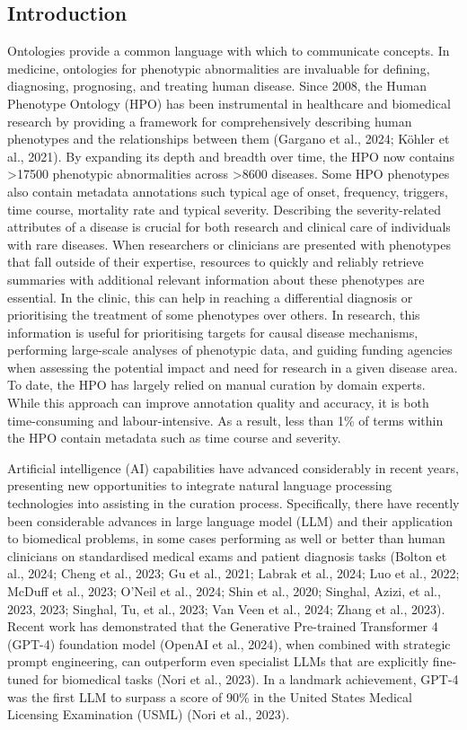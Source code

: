 \documentclass[
]{agujournal2019}
\begin{document}
\subsection{Introduction}\label{introduction}

Ontologies provide a common language with which to communicate concepts.
In medicine, ontologies for phenotypic abnormalities are invaluable for
defining, diagnosing, prognosing, and treating human disease. Since
2008, the Human Phenotype Ontology (HPO) has been instrumental in
healthcare and biomedical research by providing a framework for
comprehensively describing human phenotypes and the relationships
between them (Gargano et al., 2024; Köhler et al., 2021). By expanding
its depth and breadth over time, the HPO now contains \textgreater17500
phenotypic abnormalities across \textgreater8600 diseases. Some HPO
phenotypes also contain metadata annotations such typical age of onset,
frequency, triggers, time course, mortality rate and typical severity.
Describing the severity-related attributes of a disease is crucial for
both research and clinical care of individuals with rare diseases. When
researchers or clinicians are presented with phenotypes that fall
outside of their expertise, resources to quickly and reliably retrieve
summaries with additional relevant information about these phenotypes
are essential. In the clinic, this can help in reaching a differential
diagnosis or prioritising the treatment of some phenotypes over others.
In research, this information is useful for prioritising targets for
causal disease mechanisms, performing large-scale analyses of phenotypic
data, and guiding funding agencies when assessing the potential impact
and need for research in a given disease area. To date, the HPO has
largely relied on manual curation by domain experts. While this approach
can improve annotation quality and accuracy, it is both time-consuming
and labour-intensive. As a result, less than 1\% of terms within the HPO
contain metadata such as time course and severity.

Artificial intelligence (AI) capabilities have advanced considerably in
recent years, presenting new opportunities to integrate natural language
processing technologies into assisting in the curation process.
Specifically, there have recently been considerable advances in large
language model (LLM) and their application to biomedical problems, in
some cases performing as well or better than human clinicians on
standardised medical exams and patient diagnosis tasks (Bolton et al.,
2024; Cheng et al., 2023; Gu et al., 2021; Labrak et al., 2024; Luo et
al., 2022; McDuff et al., 2023; O'Neil et al., 2024; Shin et al., 2020;
Singhal, Azizi, et al., 2023, 2023; Singhal, Tu, et al., 2023; Van Veen
et al., 2024; Zhang et al., 2023). Recent work has demonstrated that the
Generative Pre-trained Transformer 4 (GPT-4) foundation model (OpenAI et
al., 2024), when combined with strategic prompt engineering, can
outperform even specialist LLMs that are explicitly fine-tuned for
biomedical tasks (Nori et al., 2023). In a landmark achievement, GPT-4
was the first LLM to surpass a score of 90\% in the United States
Medical Licensing Examination (USML) (Nori et al., 2023).
\end{document}
